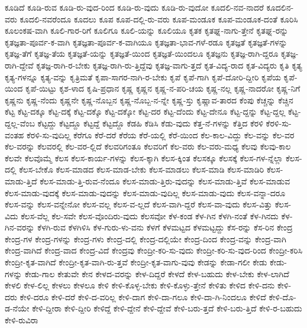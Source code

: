 {ಕೂಡಿದೆ
ಕೂಡಿ-ರುವ
ಕೂಡಿ-ರು-ವುದ-ರಿಂದ
ಕೂಡಿ-ರು-ವುದು
ಕೂಡಿ-ರು-ವುದೋ
ಕೂದಲಿ-ನವ-ನಾದರೆ
ಕೂದಲಿನ-ವರು
ಕೂದಲಿ-ನವರೆಂದೂ
ಕೂದಲು
ಕೂಪ
ಕೂಪ-ದಲ್ಲಿ-ರು-ವರು
ಕೂಪ-ಮಂಡೂಕ
ಕೂಪ-ಮಂಡೂಕ-ದಂತೆ
ಕೂರಿಸಿ
ಕೂಲಂಕಷ-ವಾಗಿ
ಕೂಲಿ-ಗಾರ-ರಿಗೆ
ಕೂಲಿಗೂ
ಕೂಲಿ-ಯನ್ನು
ಕೂಲಿಯೂ
ಕೃತಕ
ಕೃತಘ್ನ-ನಾಗು-ತ್ತೇನೆ
ಕೃತಘ್ನ-ರನ್ನು
ಕೃತಜ್ಞತಾ-ಪೂರ್ವ-ಕ-ವಾಗಿ
ಕೃತಜ್ಞತಾ-ಪೂರ್ವ-ಕ-ವಾಗಿಯೂ
ಕೃತಜ್ಞತಾ-ಭಾವ-ಗಳೆ-ರಡೂ
ಕೃತಜ್ಞತೆ
ಕೃತಜ್ಞತೆ-ಗಳನ್ನು
ಕೃತಜ್ಞ-ತೆಗೆ
ಕೃತಜ್ಞ-ತೆಯ
ಕೃತಜ್ಞತೆ-ಯನ್ನು
ಕೃತಜ್ಞತೆ-ಯಿಂದ
ಕೃತಜ್ಞತೆ-ಯಿಂದಲೂ
ಕೃತಜ್ಞನು
ಕೃತಜ್ಞ-ರಾಗಿ-ದ್ದರೂ
ಕೃತಜ್ಞ-ರಾಗಿ-ದ್ದೇವೆ
ಕೃತಜ್ಞ-ರಾಗಿ-ರ-ಬೇಕು
ಕೃತಜ್ಞ-ರಾಗಿ-ರು-ತ್ತಿದ್ದೆವು
ಕೃತಜ್ಞ-ವಾಗು-ತ್ತದೆ
ಕೃತ-ವಿದ್ಯ-ರಾದ
ಕೃತ-ವಿದ್ಯರು
ಕೃತಿ
ಕೃತ್ಯ
ಕೃತ್ಯ-ಗಳನ್ನೂ
ಕೃತ್ಯ-ವನ್ನು
ಕೃತ್ರಿಮತೆ
ಕೃಪಾ-ಸಾಗರ-ನಾಗಿ-ರ-ಬೇಕು
ಕೃಪೆ
ಕೃಪೆ-ಗಾಗಿ
ಕೃಪೆ-ದೋರಿ-ದ್ದೀರಿ
ಕೃಪೆಯ
ಕೃಪೆ-ಯಿಂದ
ಕೃಪೆ-ಯಿಟ್ಟು
ಕೃಶ-ಳಾದ
ಕೃಷಿ-ಪ್ರಧಾನ
ಕೃಷ್ಣ
ಕೃಷ್ಣನ
ಕೃಷ್ಣ-ನ-ಪರಿ-ಚಯ
ಕೃಷ್ಣ-ನಲ್ಲ
ಕೃಷ್ಣ-ನಾದರೋ
ಕೃಷ್ಣ-ನಿಗೆ
ಕೃಷ್ಣನು
ಕೃಷ್ಣ-ನೆಂದು
ಕೃಷ್ಣನೇ
ಕೃಷ್ಣ-ನೊಬ್ಬನ
ಕೃಷ್ಣ-ನೊಬ್ಬ-ನ-ನ್ನೇ
ಕೃಷ್ಣ-ಸ್ತು
ಕೃಷ್ಣಾವ-ತಾರದ
ಕೆಂಪು
ಕೆಚ್ಚನ್ನು
ಕೆಚ್ಚಿನ
ಕೆಟ್ಟ
ಕೆಟ್ಟ-ದಕ್ಕೂ
ಕೆಟ್ಟ-ದಕ್ಕೆ
ಕೆಟ್ಟ-ದಕ್ಕೊ
ಕೆಟ್ಟ-ದಕ್ಕೋ
ಕೆಟ್ಟ-ದರ
ಕೆಟ್ಟ-ದೆಂದು
ಕೆಟ್ಟ-ದೇನೂ
ಕೆಟ್ಟ-ದ್ದನ್ನು
ಕೆಟ್ಟ-ದ್ದಲ್ಲ
ಕೆಟ್ಟ-ದ್ದಲ್ಲ-ವೆಂಬ
ಕೆಟ್ಟದ್ದು
ಕೆಟ್ಟದ್ದೂ
ಕೆಟ್ಟದ್ದೆ
ಕೆಟ್ಟದ್ದೊ
ಕೆಡಹಿ
ಕೆಡಿಸಿ
ಕೆಡು-ವುದು
ಕೆತ್ತ-ನೆ-ಗಳನ್ನು
ಕೆತ್ತಿದ
ಕೆರಳಿ
ಕೆರಳಿ-ಸು-ವಂತಹ
ಕೆರಳಿ-ಸು-ವುದಿಲ್ಲ
ಕೆರೆಗೂ
ಕೆರೆ-ದರೆ
ಕೆರೆಯ
ಕೆರೆ-ಯಲ್ಲಿ
ಕೆರೆ-ಯಿಂದ
ಕೆಲ-ಕಾಲ-ವಿದ್ದು
ಕೆಲ-ವನ್ನು
ಕೆಲ-ವರ
ಕೆಲ-ವರನ್ನು
ಕೆಲವರಲ್ಲಿ
ಕೆಲ-ವರ-ಲ್ಲಿದೆ
ಕೆಲವರಿಗಂತೂ
ಕೆಲವರಿಗೆ
ಕೆಲ-ವರು
ಕೆಲ-ವರು-ಮಧ್ಯ
ಕೆಲವು
ಕೆಲವು-ಕಾಲ
ಕೆಲವೇ
ಕೆಲವೊಮ್ಮೆ
ಕೆಲಸ
ಕೆಲಸ-ಕಾರ್ಯ-ಗಳನ್ನು
ಕೆಲಸ-ಕ್ಕಾಗಿ
ಕೆಲಸ-ಕ್ಕಿಂತ
ಕೆಲಸಕ್ಕೂ
ಕೆಲಸಕ್ಕೆ
ಕೆಲಸ-ಗಳ-ನ್ನೆಲ್ಲಾ
ಕೆಲಸ-ದಲ್ಲಿ
ಕೆಲಸ-ಬೇಕೊ
ಕೆಲಸ-ಮಾಡದ
ಕೆಲಸ-ಮಾಡ-ಬೇಕು
ಕೆಲಸ-ಮಾಡಲು
ಕೆಲಸ-ಮಾಡಿ
ಕೆಲಸ-ಮಾಡಿರಿ
ಕೆಲಸ-ಮಾಡು-ತ್ತಿದೆ
ಕೆಲಸ-ಮಾಡು-ತ್ತಿ-ರುವ-ನೆಂದೂ
ಕೆಲಸ-ಮಾಡು-ತ್ತಿರು-ವುದನ್ನು
ಕೆಲಸ-ಮಾಡು-ತ್ತಿವೆ
ಕೆಲಸ-ಮಾಡುವ
ಕೆಲಸ-ಮಾಡು-ವುದಕ್ಕೆ
ಕೆಲಸ-ಮಾಡು-ವುದನ್ನು
ಕೆಲಸ-ಮಾಡು-ವುದಿಲ್ಲ
ಕೆಲಸ-ಮಾಡು-ವುದು
ಕೆಲಸ-ವನ್ನಾ-ದರೂ
ಕೆಲಸ-ವನ್ನು
ಕೆಲಸ-ವನ್ನೇನೋ
ಕೆಲಸ-ವಲ್ಲ
ಕೆಲಸ-ವ-ಲ್ಲದೆ
ಕೆಲಸ-ವಾಗಿ-ದ್ದರೆ
ಕೆಲಸ-ವಾ-ವುದು
ಕೆಲಸ-ವಿತ್ತು
ಕೆಲಸ-ವಿದು
ಕೆಲಸ-ವೆಲ್ಲ
ಕೆಲ-ಸವೇ
ಕೆಲಸ-ವೊಂದಿರು-ವುದು
ಕೆಲಸವೋ
ಕೆಳ-ಕಂಡ
ಕೆಳ-ಗಿನ
ಕೆಳಗಿ-ನಂತೆ
ಕೆಳ-ಗಿನದು
ಕೆಳ-ಗಿನ-ವರನ್ನು
ಕೆಳಗಿ-ರುವ
ಕೆಳಗಿಳಿಸಿ
ಕೆಳ-ಗುರು-ಳು-ವನು
ಕೆಳಗೆ
ಕೆಳಮಟ್ಟದ
ಕೆಳಮಟ್ಟದ್ದು
ಕೆಸ-ರನ್ನು
ಕೆಸ-ರಿನ
ಕೇಂದ್ರ
ಕೇಂದ್ರ-ಗಳ
ಕೇಂದ್ರ-ಗಳನ್ನು
ಕೇಂದ್ರ-ಗಳು
ಕೇಂದ್ರ-ದಲ್ಲಿ
ಕೇಂದ್ರ-ದಲ್ಲಿಯೇ
ಕೇಂದ್ರ-ದಿಂದ
ಕೇಂದ್ರ-ವನ್ನು
ಕೇಂದ್ರ-ವಾಗಿ
ಕೇಂದ್ರ-ವಾಗಿದೆ
ಕೇಂದ್ರ-ವಾದ
ಕೇಂದ್ರ-ವಿದೆ
ಕೇಂದ್ರವು
ಕೇಂದ್ರೀ-ಕರಿ-ಸು-ವುದು
ಕೇಂದ್ರೀ-ಕರಿ-ಸು-ವುದ-ರಿಂದ
ಕೇಂದ್ರೀ-ಕರಿಸಿ
ಕೇಂದ್ರೀ-ಕೃತ-ವಾಗಿದೆ
ಕೇಂದ್ರೀ-ಕೃತ-ವಾಗಿ-ರು-ತ್ತವೆ
ಕೇಂದ್ರೀ-ಕೃತ-ವಾಗು-ವುವು
ಕೇಡನ್ನು
ಕೇಡಾ-ಗಲೀ
ಕೇಡು
ಕೇಡು-ಗಳನ್ನು
ಕೇಡು-ಗಾಲ
ಕೇತುವೇ
ಕೇನ
ಕೇಳದ-ವರನ್ನು
ಕೇಳ-ದಿದ್ದರೆ
ಕೇಳದೆ
ಕೇಳ-ಬಹುದು
ಕೇಳ-ಬೇಕು
ಕೇಳ-ಲಾಗಿದೆ
ಕೇಳಲಿ
ಕೇಳ-ಲಿಲ್ಲ
ಕೇಳಲು
ಕೇಳಲೂ
ಕೇಳಿ
ಕೇಳಿ-ಕೊಳ್ಳ-ಬೇಕು
ಕೇಳಿ-ಕೊಳ್ಳು-ತ್ತೇನೆ
ಕೇಳಿತು
ಕೇಳಿದ
ಕೇಳಿ-ದನು
ಕೇಳಿ-ದರು
ಕೇಳಿ-ದರೂ
ಕೇಳಿ-ದರೆ
ಕೇಳಿ-ದ-ವರಿಲ್ಲ
ಕೇಳಿ-ದಾಗ
ಕೇಳಿ-ದಾ-ಗಲೂ
ಕೇಳಿ-ದಾ-ಗಿ-ನಿಂದಲೂ
ಕೇಳಿದೆ
ಕೇಳಿ-ದೊ-ಡ-ನೆಯೇ
ಕೇಳಿ-ದ್ದೀರಾ
ಕೇಳಿ-ದ್ದೀರಿ
ಕೇಳಿದ್ದೆ
ಕೇಳಿ-ದ್ದೇನೆ
ಕೇಳಿ-ದ್ದೇವೆ
ಕೇಳಿ-ಬರು-ತ್ತದೆ
ಕೇಳಿ-ಬರು-ತ್ತಿದೆ
ಕೇಳಿ-ರ-ಬಹುದು
ಕೇಳಿ-ರುವಿರಾ
}
